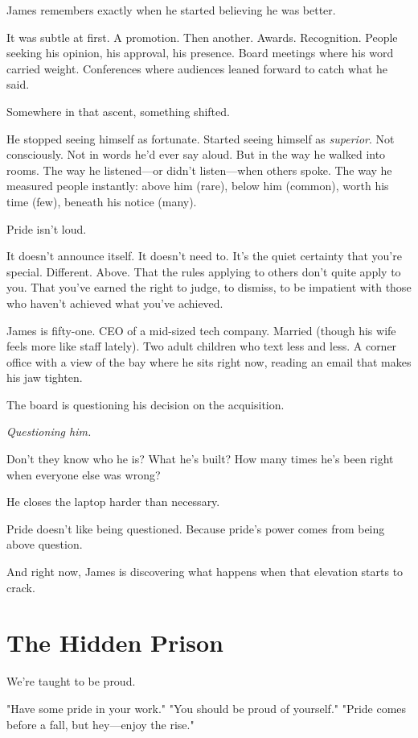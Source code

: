 \documentclass[11pt,twoside]{book}
\begin{document}
James remembers exactly when he started believing he was better.

It was subtle at first. A promotion. Then another. Awards. Recognition. People seeking his opinion, his approval, his presence. Board meetings where his word carried weight. Conferences where audiences leaned forward to catch what he said.

Somewhere in that ascent, something shifted.

He stopped seeing himself as fortunate. Started seeing himself as \emph{superior}. Not consciously. Not in words he'd ever say aloud. But in the way he walked into rooms. The way he listened—or didn't listen—when others spoke. The way he measured people instantly: above him (rare), below him (common), worth his time (few), beneath his notice (many).

Pride isn't loud.

It doesn't announce itself. It doesn't need to. It's the quiet certainty that you're special. Different. Above. That the rules applying to others don't quite apply to you. That you've earned the right to judge, to dismiss, to be impatient with those who haven't achieved what you've achieved.

James is fifty-one. CEO of a mid-sized tech company. Married (though his wife feels more like staff lately). Two adult children who text less and less. A corner office with a view of the bay where he sits right now, reading an email that makes his jaw tighten.

The board is questioning his decision on the acquisition.

\emph{Questioning him.}

Don't they know who he is? What he's built? How many times he's been right when everyone else was wrong?

He closes the laptop harder than necessary.

Pride doesn't like being questioned. Because pride's power comes from being above question.

And right now, James is discovering what happens when that elevation starts to crack.

\section*{The Hidden Prison}

We're taught to be proud.

"Have some pride in your work." "You should be proud of yourself." "Pride comes before a fall, but hey—enjoy the rise."
\end{document}
